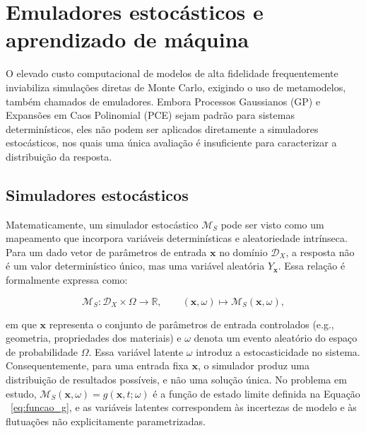\section{Emuladores estoc\'asticos e aprendizado de m\'aquina}\label{sec:emuladores}


O elevado custo computacional de modelos de alta fidelidade frequentemente inviabiliza simulações diretas de Monte Carlo, exigindo o uso de metamodelos, também chamados de emuladores. Embora Processos Gaussianos (GP) \parencite{rasmussen2006} e Expansões em Caos Polinomial (PCE) \parencite{xiu2002} sejam padrão para sistemas determinísticos, eles não podem ser aplicados diretamente a simuladores estocásticos, nos quais uma única avaliação é insuficiente para caracterizar a distribuição da resposta.

\subsection{Simuladores estoc\'asticos}
\label{subsec:simulador}

Matematicamente, um simulador estocástico $\mathcal{M}_S$ pode ser visto como um mapeamento que incorpora variáveis determinísticas e aleatoriedade intrínseca. Para um dado vetor de parâmetros de entrada $\mathbf{x}$ no domínio $\mathcal{D}_X$, a resposta não é um valor determinístico único, mas uma variável aleatória $Y_{\mathbf{x}}$. Essa relação é formalmente expressa como:

\begin{equation}
\mathcal{M}_S : \mathcal{D}_X \times \Omega \rightarrow \mathbb{R}, \qquad (\mathbf{x}, \omega) \mapsto \mathcal{M}_S(\mathbf{x}, \omega),
\label{eq:simulador_estocastico}
\end{equation}

\noindent em que $\mathbf{x}$ representa o conjunto de parâmetros de entrada controlados (e.g., geometria, propriedades dos materiais) e $\omega$ denota um evento aleatório do espaço de probabilidade $\Omega$. Essa variável latente $\omega$ introduz a estocasticidade no sistema. Consequentemente, para uma entrada fixa $\mathbf{x}$, o simulador produz uma distribuição de resultados possíveis, e não uma solução única. No problema em estudo, $\mathcal{M}_S(\mathbf{x}, \omega) = g(\mathbf{x}, t; \omega)$ é a função de estado limite definida na Equação ~\eqref{eq:funcao_g}, e as variáveis latentes correspondem às incertezas de modelo e às flutuações não explicitamente parametrizadas.

